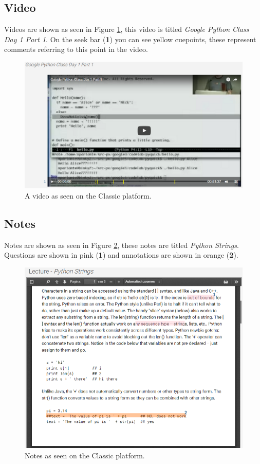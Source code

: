 \documentclass[a4paper,11pt]{report}
\begin{document}
\subsection{Video}
\label{stu:video}
Videos are shown as seen in Figure \ref{fig:stu_video}, this video is titled \textit{Google Python Class Day 1 Part 1}. On the seek bar (\textbf{1}) you can see yellow cuepoints, these represent comments referring to this point in the video.
\begin{figure}[H]
\centering
\includegraphics[scale=0.35]{imgs/stu_video.png}
\caption{A video as seen on the Classic platform.}
\label{fig:stu_video}
\end{figure}

\subsection{Notes}
\label{stu:notes}
Notes are shown as seen in Figure \ref{fig:stu_notes}, these notes are titled \textit{Python Strings}. Questions are shown in pink (\textbf{1}) and annotations are shown in orange (\textbf{2}).

\begin{figure}[H]
\centering
\includegraphics[scale=0.45]{imgs/stu_notes.png}
\caption{Notes as seen on the Classic platform.}
\label{fig:stu_notes}
\end{figure}
\end{document}
